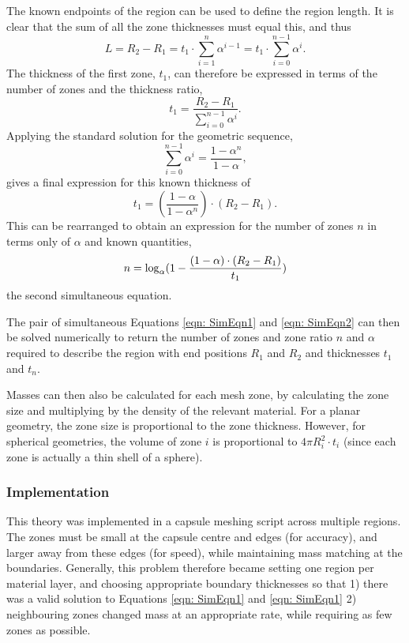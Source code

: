 The known endpoints of the region can be used to define the region length. It is clear that the sum of all the zone thicknesses must equal this, and thus
\begin{equation}{L = R_2 - R_1 = t_1 \cdot \sum_{i=1}^{n} \alpha^{i-1} = t_1 \cdot \sum_{i=0}^{n-1} \alpha^{i}.}\end{equation}
The thickness of the first zone, $t_1$, can therefore be expressed in terms of the number of zones and the thickness ratio,
\begin{equation}{t_1  = \frac{R_2 - R_1}{\sum_{i=0}^{n-1} \alpha^{i}}.}\end{equation}
Applying the standard solution for the geometric sequence, 
\begin{equation}{{\sum_{i=0}^{n-1} \alpha^{i}} = \frac{1 - \alpha^n}{1 - \alpha},}\end{equation}
gives a final expression for this known thickness of 
\begin{equation}{t_1  = ( \frac{1 - \alpha}{1 - \alpha^n} )\cdot (R_2 - R_1).}\end{equation}
This can be rearranged to obtain an expression for the number of zones $n$ in terms only of $\alpha$ and known quantities,
\begin{equation}{\label{eqn: SimEqn2} n  =  \log_{\alpha} (1 - \frac{ (1-\alpha) \cdot(R_2 - R_1)}{t_1} )}\end{equation}
the second simultaneous equation.

The pair of simultaneous Equations \ref{eqn: SimEqn1} and \ref{eqn: SimEqn2} can then be solved numerically to return the number of zones and zone ratio $n$ and $\alpha$ required to describe the region with end positions $R_1$ and $R_2$ and thicknesses $t_1$ and $t_n$.

Masses can then also be calculated for each mesh zone, by calculating the zone size and multiplying by the density of the relevant material. For a planar geometry, the zone size is proportional to the zone thickness. However, for spherical geometries, the volume of zone $i$ is proportional to $4 \pi R_i^2 \cdot t_i$ (since each zone is actually a thin shell of a sphere).

\subsubsection{Implementation}
This theory was implemented in a capsule meshing script across multiple regions. The zones must be small at the capsule centre and edges (for accuracy), and larger away from these edges (for speed), while maintaining mass matching at the boundaries. Generally, this problem therefore became setting one region per material layer, and choosing appropriate boundary thicknesses so that 1) there was a valid solution to Equations \ref{eqn: SimEqn1} and \ref{eqn: SimEqn1} 2) neighbouring zones changed mass at an appropriate rate, while requiring as few zones as possible.

